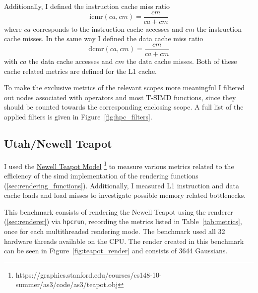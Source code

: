 \documentclass[a4paper, 11pt]{memoir}
\begin{document}
    Additionally, I defined the instruction cache miss ratio
    \begin{equation}
        \text{icmr}(ca, cm) = \frac{cm}{ca + cm}
    \end{equation}
    where $ca$ corresponds to the instruction cache accesses and $cm$ the instruction cache misses. In the same way I defined
    the data cache miss ratio
    \begin{equation}
        \text{dcmr}(ca, cm) = \frac{cm}{ca + cm}
    \end{equation}
    with $ca$ the data cache accesses and $cm$ the data cache misses. Both of these cache related metrics are defined
    for the L1 cache.

    To make the exclusive metrics of the relevant scopes more meaningful I filtered out nodes associated with operators
    and most T-SIMD functions, since they should be counted towards the corresponding enclosing scope. A full list of the
    applied filters is given in Figure~\ref{fig:hpc_filters}.

    \subsection{Utah/Newell Teapot}
    \label{sec:utah_teapot}
    I used the \href{https://graphics.stanford.edu/courses/cs148-10-summer/as3/code/as3/teapot.obj}{Newell Teapot Model}
    \footnote{https://graphics.stanford.edu/courses/cs148-10-summer/as3/code/as3/teapot.obj} to measure various metrics
    related to the efficiency of the \gls{simd} implementation of the rendering functions (\ref{sec:rendering_functions}).
    Additionally, I measured L1 instruction and data cache loads and load misses to investigate possible memory related
    bottlenecks.

    This benchmark consists of rendering the Newell Teapot using the renderer (\ref{sec:renderer}) via \texttt{hpcrun},
    recording the metrics listed in Table~\ref{tab:metrics}, once for each multithreaded rendering mode. The benchmark
    used all 32 hardware threads available on the CPU. The render created in this benchmark can be seen in
    Figure~\ref{fig:teapot_render} and consists of 3644 Gaussians.
\end{document}
